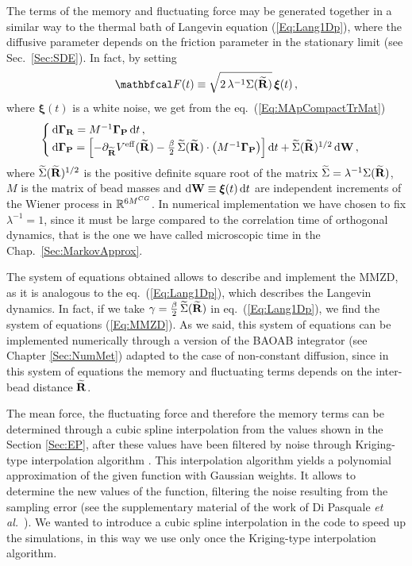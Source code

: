 \documentclass[10pt,a4paper]{book}
\theoremstyle{definition}
\begin{document}
\noindent
The terms of the memory and fluctuating force may be generated together in a similar way to the thermal bath of Langevin equation (\ref{Eq:Lang1Dp}), where the diffusive parameter depends on the friction parameter in the stationary limit (see Sec.~\ref{Sec:SDE}). In fact, by setting
\[
 \fprojbf(t) \equiv \sqrt{2\,\lambda^{-1}\Sigma(\widetilde{\bfR})}\, \boldsymbol{\xi}(t)\,,
\] 
where $\boldsymbol{\xi}(t)$ is a white noise, we get from the eq.~(\ref{Eq:MApCompactTrMat})
\begin{equation}
\label{Eq:MMZD}
\begin{cases}
 \mbox{d} \boldsymbol\Gamma_{\mathbf{R}} = M^{-1}\boldsymbol\Gamma_{\mathbf{P}} \,\mbox{d} t \,, & \\
 \mbox{d} \boldsymbol\Gamma_{\mathbf{P}} = \left[ - \partial_{\widetilde{\mathbf{R}}}V^{\mathrm{eff}}(\widetilde{\mathbf{R}}) 
                     - \frac{\beta}{2}\, \widetilde{\Sigma}(\widetilde{\mathbf{R}}) \cdot \left(M^{-1}\boldsymbol\Gamma_{\mathbf{P}}\right) \right]\mbox{d} t 
                     + \widetilde{\Sigma} (\widetilde{\mathbf{R}})^{1/2} \,\mbox{d} \mathbf{W} \,, &  
\end{cases}
\end{equation}
where $\widetilde{\Sigma}(\widetilde{\mathbf{R}})^{1/2}$ is the positive definite square root of the matrix $\widetilde{\Sigma}=\lambda^{-1}\Sigma(\widetilde{\mathbf{R}})$, $M$ is the matrix of bead masses and $\mbox{d} \mathbf{W} \equiv \boldsymbol{\xi}(t) \,\mbox{d} t$ are independent increments of the Wiener process in $\mathbb{R}^{6M^{CG}}$. In numerical implementation we have chosen to fix $\lambda^{-1}=1$, since it must be large compared to the correlation time of orthogonal dynamics, that is the one we have called microscopic time in the Chap.~\ref{Sec:MarkovApprox}.

The system of equations obtained allows to describe and implement the MMZD, as it is analogous to the eq.~(\ref{Eq:Lang1Dp}), which describes the Langevin dynamics. In fact, if we take $\gamma=\frac{\beta}{2}\, \widetilde{\Sigma}(\widetilde{\mathbf{R}})$ in eq.~(\ref{Eq:Lang1Dp}), we find the system of equations (\ref{Eq:MMZD}). As we said, this system of equations can be implemented numerically through a version of the BAOAB integrator (see Chapter \ref{Sec:NumMet}) adapted to the case of non-constant diffusion, since in this system of equations the memory and fluctuating terms depends on the inter-bead distance $\widetilde{\mathbf{R}}$. 

The mean force, the fluctuating force and therefore the memory terms can be determined through a cubic spline interpolation from the values shown in the Section \ref{Sec:EP}, after these values have been filtered by noise through Kriging-type interpolation algorithm \cite{Jones2001}. This interpolation algorithm yields a polynomial approximation of the given function with Gaussian weights. It allows to determine the new values of the function, filtering the noise resulting from the sampling error (see the supplementary material of the work of Di Pasquale \textit{et al.}~\cite{DiPasquale2019}). We wanted to introduce a cubic spline interpolation in the code to speed up the simulations, in this way we use only once the Kriging-type interpolation algorithm.
\end{document}
